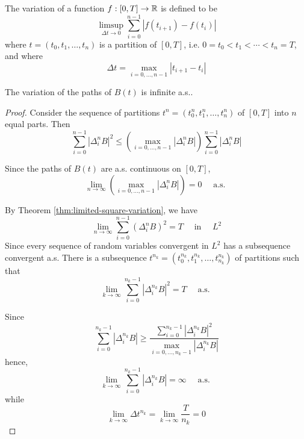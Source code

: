 \begin{definition}[Variation]
	The variation of a function $f:[0,T]\rightarrow{\mathbb R}$ is defined to be
	\begin{equation}
		\limsup_{\Delta t\rightarrow 0}\sum_{i=0}^{n-1}\left|f\left(t_{i+1}\right)-f\left(t_{i}\right)\right|
	\end{equation}
	where $t=\left(t_{0},t_{1},\ldots,t_{n}\right)$ is a partition of $[0,T]$, i.e. $0=t_{0}<t_{1}<\cdots<t_{n}=T$, and where
	\begin{equation}
		\Delta t=\max_{i=0,\ldots,n-1}\left|t_{i+1}-t_{i}\right|
	\end{equation}
\end{definition}

\begin{theorem}
	The variation of the paths of $B(t)$ is infinite a.s..
\end{theorem}

\begin{proof}
	Consider the sequence of partitions $t^{n}=\left(t_{0}^{n},t_{1}^{n},\ldots,t_{n}^{n}\right)$ of $[0,T]$ into $n$ equal parts. Then
	\begin{equation*}
		\sum_{i=0}^{n-1}\left|\Delta_{i}^{n}B\right|^{2}\leq\left(\max_{i=0,\ldots,n-1}\left|\Delta_{i}^{n}B\right|\right)\sum_{i=0}^{n-1}\left|\Delta_{i}^{n}B\right|
	\end{equation*}

	Since the paths of $B(t)$ are a.s. continuous on $[0,T]$,
	\begin{equation*}
		\lim_{n\rightarrow\infty}\left(\max_{i=0,\ldots,n-1}\left|\Delta_{i}^{n}B\right|\right)=0\quad\text{ a.s. }
	\end{equation*}

	By Theorem \ref{thm:limited-square-variation}, we have
	\begin{equation*}
		\lim_{n\rightarrow\infty}\sum_{i=0}^{n-1}\left(\Delta_{i}^{n}B\right)^{2}=T\quad\text { in }\quad L^{2}
	\end{equation*}
	Since every sequence of random variables convergent in $L^{2}$ has a subsequence convergent a.s. There is a subsequence $t^{n_{k}}=\left(t_{0}^{n_{k}},t_{1}^{n_{k}},\ldots,t_{n_{k}}^{n_{k}}\right)$ of partitions such that
	\begin{equation*}
		\lim_{k\rightarrow\infty}\sum_{i=0}^{n_{k}-1}\left|\Delta_{i}^{n_{k}}B\right|^{2}=T\quad\text{ a.s. }
	\end{equation*}

	Since
	\begin{equation*}
		\sum_{i=0}^{n_{k}-1}\left|\Delta_{i}^{n_{k}}B\right|\geq\frac{\sum_{i=0}^{n_{k}-1}\left|\Delta_{i}^{n_{k}}B\right|^{2}}{\max_{i=0,\ldots,n_{k}-1}\left|\Delta_{i}^{n_{k}}B\right|}
	\end{equation*}
	hence,
	\begin{equation*}
		\lim_{k\rightarrow\infty}\sum_{i=0}^{n_{k}-1}\left|\Delta_{i}^{n_{k}}B\right|=\infty\quad\text{ a.s. }
	\end{equation*}
	while
	\begin{equation*}
		\lim_{k\rightarrow\infty}\Delta t^{n_{k}}=\lim_{k\rightarrow\infty}\frac{T}{n_{k}}=0
	\end{equation*}
\end{proof}

